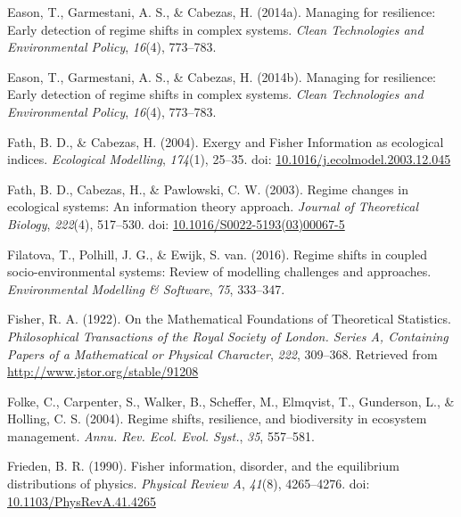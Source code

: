 \documentclass[12pt,twoside,openany]{reedthesis}
\begin{document}
\leavevmode\hypertarget{ref-eason_managing_2014}{}%
Eason, T., Garmestani, A. S., \& Cabezas, H. (2014a). Managing for resilience: Early detection of regime shifts in complex systems. \emph{Clean Technologies and Environmental Policy}, \emph{16}(4), 773--783.

\leavevmode\hypertarget{ref-eason2014managing}{}%
Eason, T., Garmestani, A. S., \& Cabezas, H. (2014b). Managing for resilience: Early detection of regime shifts in complex systems. \emph{Clean Technologies and Environmental Policy}, \emph{16}(4), 773--783.

\leavevmode\hypertarget{ref-fath_exergy_2004}{}%
Fath, B. D., \& Cabezas, H. (2004). Exergy and Fisher Information as ecological indices. \emph{Ecological Modelling}, \emph{174}(1), 25--35. doi: \href{https://doi.org/10.1016/j.ecolmodel.2003.12.045}{10.1016/j.ecolmodel.2003.12.045}

\leavevmode\hypertarget{ref-fath_regime_2003}{}%
Fath, B. D., Cabezas, H., \& Pawlowski, C. W. (2003). Regime changes in ecological systems: An information theory approach. \emph{Journal of Theoretical Biology}, \emph{222}(4), 517--530. doi: \href{https://doi.org/10.1016/S0022-5193(03)00067-5}{10.1016/S0022-5193(03)00067-5}

\leavevmode\hypertarget{ref-filatova2016regime}{}%
Filatova, T., Polhill, J. G., \& Ewijk, S. van. (2016). Regime shifts in coupled socio-environmental systems: Review of modelling challenges and approaches. \emph{Environmental Modelling \& Software}, \emph{75}, 333--347.

\leavevmode\hypertarget{ref-fisher_mathematical_1922}{}%
Fisher, R. A. (1922). On the Mathematical Foundations of Theoretical Statistics. \emph{Philosophical Transactions of the Royal Society of London. Series A, Containing Papers of a Mathematical or Physical Character}, \emph{222}, 309--368. Retrieved from \url{http://www.jstor.org/stable/91208}

\leavevmode\hypertarget{ref-folke2004regime}{}%
Folke, C., Carpenter, S., Walker, B., Scheffer, M., Elmqvist, T., Gunderson, L., \& Holling, C. S. (2004). Regime shifts, resilience, and biodiversity in ecosystem management. \emph{Annu. Rev. Ecol. Evol. Syst.}, \emph{35}, 557--581.

\leavevmode\hypertarget{ref-frieden_fisher_1990}{}%
Frieden, B. R. (1990). Fisher information, disorder, and the equilibrium distributions of physics. \emph{Physical Review A}, \emph{41}(8), 4265--4276. doi: \href{https://doi.org/10.1103/PhysRevA.41.4265}{10.1103/PhysRevA.41.4265}
\end{document}
